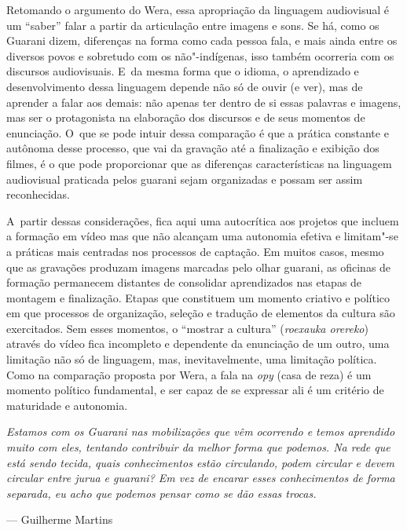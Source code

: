 Retomando o argumento do Wera, essa apropriação da linguagem audiovisual
é um ``saber'' falar a partir da articulação
entre imagens e sons. Se há, como os Guarani dizem, diferenças na forma
como cada pessoa fala, e mais ainda entre os diversos povos e sobretudo
com os não"-indígenas, isso também ocorreria com os discursos
audiovisuais. E~da mesma forma que o idioma, o aprendizado e
desenvolvimento dessa linguagem depende não só de ouvir (e ver), mas de
aprender a falar aos demais: não apenas ter dentro de si essas palavras
e imagens, mas ser o protagonista na elaboração dos discursos e de seus
momentos de enunciação. O~que se pode intuir dessa comparação é que a
prática constante e autônoma desse processo, que vai da gravação até a
finalização e exibição dos filmes, é o que pode proporcionar que as
diferenças características na linguagem audiovisual praticada pelos
guarani sejam organizadas e possam ser assim reconhecidas. 

A~partir dessas considerações, fica aqui uma autocrítica aos projetos
que incluem a formação em vídeo mas que não alcançam uma autonomia
efetiva e limitam"-se a práticas mais centradas nos processos de
captação. Em muitos casos, mesmo que as gravações produzam imagens
marcadas pelo olhar guarani, as oficinas de formação permanecem
distantes de consolidar aprendizados nas etapas de montagem e
finalização. Etapas que constituem um momento criativo e político em
que processos de organização, seleção e tradução de elementos da
cultura são exercitados. Sem esses momentos, o ``mostrar a cultura''
(\emph{roexauka orereko}) através do vídeo fica incompleto e dependente da
enunciação de um outro, uma limitação não só de linguagem, mas,
inevitavelmente, uma limitação política. Como na comparação proposta
por Wera, a fala na \emph{opy} (casa de reza) é um momento político
fundamental, e ser capaz de se expressar ali é um critério de
maturidade e autonomia.

\clearpage

\vspace*{\fill}

\begin{flushright}
\begin{minipage}[c]{0.85\textwidth}
\raggedleft
\footnotesize
\emph{Estamos com os Guarani nas mobilizações que vêm ocorrendo e temos
aprendido muito com eles, tentando contribuir da melhor forma que
podemos. Na rede que está sendo tecida, quais conhecimentos estão
circulando, podem circular e devem circular entre \emph{jurua} e guarani? Em
vez de encarar esses conhecimentos de forma separada, eu acho que
podemos pensar como se dão essas trocas.}

\smallskip
\hspace*{\fill}--- Guilherme Martins
\end{minipage}
\end{flushright}

